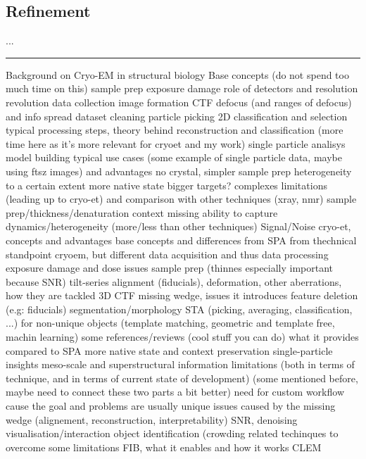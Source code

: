 \subsection{Refinement}\label{refinement}
...

\FloatBarrier

\rule{\textwidth}{1pt}

\begin{outline}
\1 Background on Cryo-EM in structural biology
    \2 Base concepts (do not spend too much time on this)
        \3 \tick sample prep
        \3 \tick exposure damage
        \3 \tick role of detectors and resolution revolution \cite{faruqiCCDDetectorsHighresolution2000}
        \3 \tick data collection
        \3 \tick image formation
        \3 \tick CTF
        \3 \tick defocus (and ranges of defocus) and info spread
        \3 \tick dataset cleaning
        \3 particle picking
        \3 2D classification and selection
        \3 typical processing steps, theory behind reconstruction and classification (more time here as it's more relevant for cryoet and my work)
        \3 single particle analisys
        \3 model building
    \2 typical use cases (some example of single particle data, maybe using ftsz images) and advantages
        \3 no crystal, simpler sample prep
        \3 heterogeneity to a certain extent
        \3 more native state
        \3 bigger targets? complexes
    \2 limitations (leading up to cryo-et) and comparison with other techniques (xray, nmr)
        \3 sample prep/thickness/denaturation
        \3 context missing
        \3 ability to capture dynamics/heterogeneity (more/less than other techniques)
        \3 Signal/Noise
\1 cryo-et, concepts and advantages
    \2 base concepts and differences from SPA from thechnical standpoint
        \2 cryoem, but different data acquisition and thus data processing
        \3 exposure damage and dose issues
        \3 sample prep (thinnes especially important because SNR)
        \3 tilt-series alignment (fiducials), deformation, other aberrations, how they are tackled
        \3 3D CTF
        \3 missing wedge, issues it introduces
        \3 feature deletion (e.g: fiducials)
        \3 segmentation/morphology
        \3 STA (picking, averaging, classification, ...) for non-unique objects (template matching, geometric and template free, machin learning)
    \2 some references/reviews (cool stuff you can do)
        \3 \cite{turkPromiseChallengesCryoelectron2020,lucicCryoelectronTomographyChallenge2013}
    \2 what it provides compared to SPA
        \3 more native state and context preservation
        \3 single-particle insights
        \3 meso-scale and superstructural information
    \2 limitations (both in terms of technique, and in terms of current state of development)
        \3 (some mentioned before, maybe need to connect these two parts a bit better)
        \3 need for custom workflow cause the goal and problems are usually unique
        \3 issues caused by the missing wedge (alignement, reconstruction, interpretability)
        \3 SNR, denoising
        \3 visualisation/interaction
        \3 object identification (crowding
    \2 related techinques to overcome some limitations
        \3 FIB, what it enables and how it works
        \2 CLEM
\end{outline}
